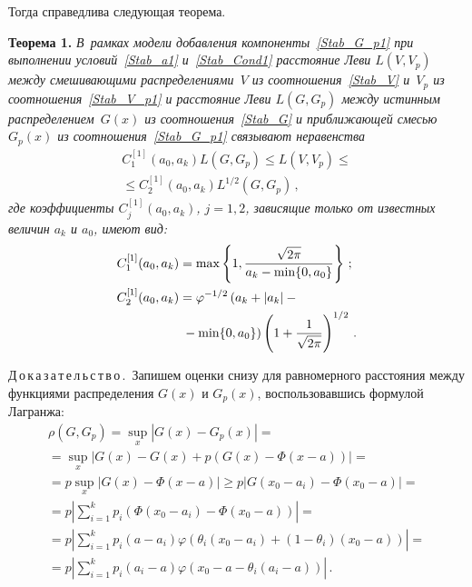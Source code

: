 \begin{multicols}{2}
Тогда справедлива следующая теорема.

\medskip

\noindent
\textbf{Теорема 1.}
\textit{В~рамках модели добавления компоненты~\eqref{Stab_G_p1} при
выполнении условий~\eqref{Stab_a1} и~\eqref{Stab_Cond1} расстояние
Леви $L(V,V_p)$ между смешивающими распределениями~$V$ из
соотношения~\eqref{Stab_V} и~$V_p$ из соотношения~\eqref{Stab_V_p1}
и расстояние Леви $L(G,G_p)$ между истинным распределением~$G(x)$
из соотношения~\eqref{Stab_G} и приближающей смесью $G_p(x)$ из
соотношения~\eqref{Stab_G_p1} связывают неравенства}
\begin{multline*}
C_1^{[1]}(a_0,a_k)L(G,G_p)\leqslant L(V,V_p)\leqslant{}\\
{}\leqslant
C_2^{[1]}(a_0,a_k)L^{1/2}(G,G_p)\,, 
\end{multline*}
\textit{где коэффициенты $C_j^{[1]}(a_0,a_k)$, $j=1,2$, зависящие
только от известных величин $a_k$ и $a_0$, имеют вид:}
\begin{align}
C_1^{[1]}(a_0,a_k)&=\max
\left\{1,\displaystyle\frac{\displaystyle \sqrt{2\pi}\mathstrut}{\displaystyle a_k-\min\{0,a_0\}\mathstrut}\right\}\,;
\label{Stab_C11}\\
C_2^{[1]}(a_0,a_k)&=\varphi^{-1/2}\left(a_k+|a_k|-{}\right.\notag\\
&\left.{}-\min\{0,a_0\}\right)
\left(1+\displaystyle\frac{\displaystyle 1\mathstrut}{\displaystyle \sqrt{2\pi}\mathstrut}\right)^{1/2}\,.
\label{Stab_C12}
\end{align}


\medskip

\noindent
Д\,о\,к\,а\,з\,а\,т\,е\,л\,ь\,с\,т\,в\,о\,.\ 
Запишем оценки снизу для равномерного расстояния между функциями
распределения $G(x)$ и $G_p(x)$, воспользовавшись формулой
Лагранжа:
\begin{multline}
\rho(G,G_p)=\sup\limits_x|G(x)-G_p(x)|={}\\
{}=\sup\limits_x|G(x)-
G(x)+p(G(x)-\Phi(x-a))|={}\\
{}=p\sup\limits_x|G(x)-\Phi(x-a)|\geqslant
p|G(x_0-a_i)-\Phi(x_0-a)|={}\\
{}=p\left|\sum\limits_{i=1}^k
p_i\left(\Phi(x_0-a_i)-\Phi(x_0-a)\right)\right|={}\\
\!\!{}=\!p\left|\sum\limits_{i=1}^k
p_i(a-a_i)\varphi(\theta_i(x_0-a_i)\!+\!(1-\theta_i)(x_0-a))\right|\!={}\\
{}=p\left|\sum\limits_{i=1}^k p_i(a_i-a)\varphi(x_0-a-\theta_i(a_i-a))\right|\,.
\label{rho}
\end{multline}


\end{multicols}
